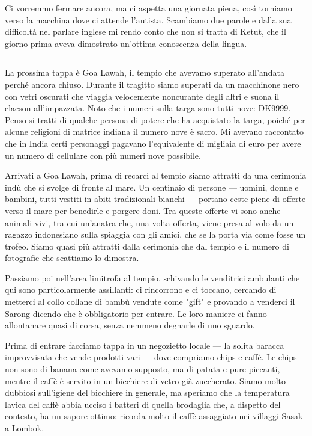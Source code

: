 Ci vorremmo fermare ancora, ma ci aspetta una giornata piena, così torniamo verso la macchina dove ci attende l’autista. Scambiamo due parole e dalla sua difficoltà nel parlare inglese mi rendo conto che non si tratta di Ketut, che il giorno prima aveva dimostrato un'ottima conoscenza della lingua.

\begin{center}
    \noindent\rule{0.6\textwidth}{0.4pt}
\end{center}

La prossima tappa è Goa Lawah, il tempio che avevamo superato all'andata perché ancora chiuso. Durante il tragitto siamo superati da un macchinone nero con vetri oscurati che viaggia velocemente noncurante degli altri e suona il clacson all'impazzata. Noto che i numeri sulla targa sono tutti nove: DK9999. Penso si tratti di qualche persona di potere che ha acquistato la targa, poiché per alcune religioni di matrice indiana il numero nove è sacro. Mi avevano raccontato che in India certi personaggi pagavano l’equivalente di migliaia di euro per avere un numero di cellulare con più numeri nove possibile.

Arrivati a Goa Lawah, prima di recarci al tempio siamo attratti da una cerimonia indù che si svolge di fronte al mare. Un centinaio di persone — uomini, donne e bambini, tutti vestiti in abiti tradizionali bianchi — portano ceste piene di offerte verso il mare per benedirle e porgere doni. Tra queste offerte vi sono anche animali vivi, tra cui un'anatra che, una volta offerta, viene presa al volo da un ragazzo indonesiano sulla spiaggia con gli amici, che se la porta via come fosse un trofeo. Siamo quasi più attratti dalla cerimonia che dal tempio e il numero di fotografie che scattiamo lo dimostra.

Passiamo poi nell'area limitrofa al tempio, schivando le venditrici ambulanti che qui sono particolarmente assillanti: ci rincorrono e ci toccano, cercando di metterci al collo collane di bambù vendute come "gift" e provando a venderci il Sarong dicendo che è obbligatorio per entrare. Le loro maniere ci fanno allontanare quasi di corsa, senza nemmeno degnarle di uno sguardo.

Prima di entrare facciamo tappa in un negozietto locale — la solita baracca improvvisata che vende prodotti vari — dove compriamo chips e caffè. Le chips non sono di banana come avevamo supposto, ma di patata e pure piccanti, mentre il caffè è servito in un bicchiere di vetro già zuccherato. Siamo molto dubbiosi sull'igiene del bicchiere in generale, ma speriamo che la temperatura lavica del caffè abbia ucciso i batteri di quella brodaglia che, a dispetto del contesto, ha un sapore ottimo: ricorda molto il caffè assaggiato nei villaggi Sasak a Lombok.

